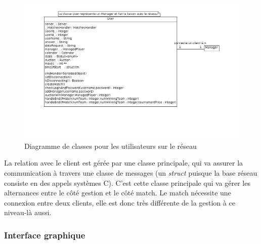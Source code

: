 \documentclass[a4paper,titlepage]{scrreprt}
\begin{document}
        
          \begin{figure}[H]
          \center
          \includegraphics[scale=0.35]{uml/class/User.png}
         \caption{Diagramme de classes pour les utilisateurs sur le réseau}
         \end{figure}

          La relation avec le client est gérée par une classe principale, qui va assurer la communication
          à travers une classe de messages (un \emph{struct} puisque la base réseau consiste en des appels systèmes C).
          C'est cette classe principale qui va gérer les alternances entre le côté gestion et le côté match. Le match nécessite une connexion entre deux clients, elle est donc très différente de la gestion
          à ce niveau-là aussi.

      \subsubsection{Interface graphique}
  
\end{document}

